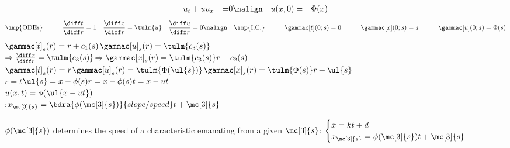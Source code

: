 \begin{sectionbox}
\nospacing
    \begin{alignat}{3}
        &u_t+u u_x&=&0 \nonumber\nalign
        &u(x,0)&=&\Phi(x)\label{eq:Burgers Equation}
    \end{alignat}
    \begin{alignat*}{5}
    &\imp{\text{ODEs}}         &\qquad          &\frac{\diff t}{\diff r}=1 &       &\frac{\diff x}{\diff r}=\tulm{u}&          &\frac{\diff u}{\diff r}=0   \nalign
    &\imp{\text{I.C.}}         &\qquad          &\gammac[t](0;s)=0  &\qquad &\gammac[x](0;s)=s           &\qquad   &\gammac[u](0;s)=\Phi(s)
    \end{alignat*}
              \hfil $\gammac[t]_s(r)=r+c_1(s)$\hfil    $\gammac[u]_s(r)=\tulm{c_3(s)}$\\
    $\Rightarrow \frac{\diff x}{\diff r}=\tulm{c_3(s)}$\hfil $\Rightarrow\gammac[x]_s(r)=\tulm{c_3(s)}r+c_2(s)$\\
     \hfil $\gammac[t]_s(r)=r$\hfil $\gammac[u]_s(r)=\tulm{\Phi(\ul{s})}$\hfil $\gammac[x]_s(r)=\tulm{\Phi(s)}r+\ul{s}$\\
     \hfil $r=t$\hfil $\ul{s}=x-\phi(s)r=x-\phi(s)t=x-ut$\\
    \hfil $u(x,t)=\phi(\ul{x-ut})$\\
     :\hfil $x_{\mc[3]{s}}=\bdra{\phi(\mc[3]{s})}{\normalfont{slope/speed}}t+\mc[3]{s}$
\end{sectionbox}
\begin{sectionbox}
    $\phi(\mc[3]{s})$ determines the speed of a characteristic emanating from a given $\mc[3]{s}$:\hfil
    $\begin{cases}
        x=kt+d      \\
        x_{\mc[3]{s}}=\phi(\mc[3]{s})t+\mc[3]{s}  \\
    \end{cases}$
\end{sectionbox}
